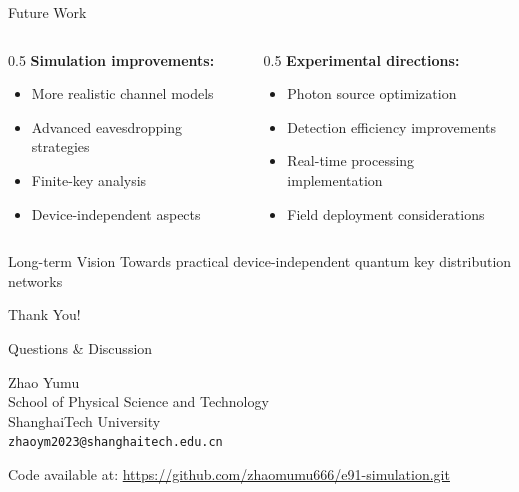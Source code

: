 \documentclass[10pt]{beamer}
\begin{document}
\begin{frame}{Future Work}
    \begin{columns}
        \begin{column}{0.5\textwidth}
            \textbf{Simulation improvements:}
            \begin{itemize}
                \item More realistic channel models
                \item Advanced eavesdropping strategies
                \item Finite-key analysis
                \item Device-independent aspects
            \end{itemize}
        \end{column}
        
        \begin{column}{0.5\textwidth}
            \textbf{Experimental directions:}
            \begin{itemize}
                \item Photon source optimization
                \item Detection efficiency improvements
                \item Real-time processing implementation
                \item Field deployment considerations
            \end{itemize}
        \end{column}
    \end{columns}
    
    \vspace{5mm}
    \begin{block}{Long-term Vision}
        \vspace{1mm}
        Towards practical device-independent quantum key distribution networks
    \end{block}
\end{frame}



\begin{frame}{}
    \centering
    \vspace{1cm}
    
    \Huge Thank You!
    
    \vspace{1cm}
    
    \large Questions \& Discussion
    
    \vspace{1.5cm}
    
    \normalsize
    Zhao Yumu \\
    School of Physical Science and Technology \\
    ShanghaiTech University \\
    \texttt{zhaoym2023@shanghaitech.edu.cn}
    
    \vspace{0.5cm}
    
    \footnotesize
    Code available at: \url{https://github.com/zhaomumu666/e91-simulation.git}
\end{frame}
\end{document}
